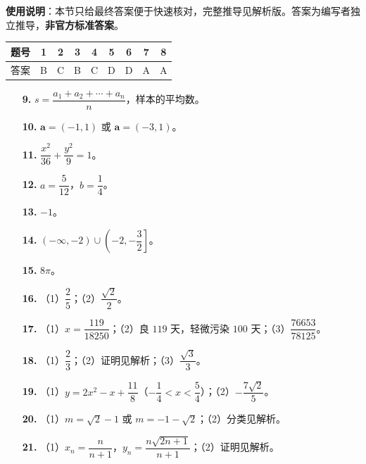 
\begin{gknotice}
\textbf{使用说明}：本节只给最终答案便于快速核对，完整推导见解析版。答案为编写者独立推导，\textbf{非官方标准答案}。
\end{gknotice}

\begin{center}\begin{tabular}{ccccccccc}
\toprule
题号 & 1 & 2 & 3 & 4 & 5 & 6 & 7 & 8 \\
\midrule
答案 & B & C & B & C & D & D & A & A \\
\bottomrule
\end{tabular}\end{center}

\begin{itemize}[leftmargin=2.6em]
  \item[\textbf{9.}] $s=\dfrac{a_1+a_2+\cdots+a_n}{n}$，样本的平均数。
  \item[\textbf{10.}] $\boldsymbol a=(-1,1)$ 或 $\boldsymbol a=(-3,1)$。
  \item[\textbf{11.}] $\dfrac{x^2}{36}+\dfrac{y^2}{9}=1$。
  \item[\textbf{12.}] $a=\dfrac{5}{12}$，$b=\dfrac14$。
  \item[\textbf{13.}] $-1$。
  \item[\textbf{14.}] $(-\infty,-2)\cup\left(-2,-\dfrac32\right]$。
  \item[\textbf{15.}] $8\pi$。
\end{itemize}

\begin{itemize}[leftmargin=2.6em]
  \item[\textbf{16.}] （1）$\dfrac25$；（2）$\dfrac{\sqrt2}{2}$。
  \item[\textbf{17.}] （1）$x=\dfrac{119}{18250}$；（2）良 $119$ 天，轻微污染 $100$ 天；（3）$\dfrac{76653}{78125}$。
  \item[\textbf{18.}] （1）$\dfrac23$；（2）证明见解析；（3）$\dfrac{\sqrt3}{3}$。
  \item[\textbf{19.}] （1）$y=2x^2-x+\dfrac{11}{8}$（$-\dfrac14<x<\dfrac54$）；（2）$-\dfrac{7\sqrt2}{5}$。
  \item[\textbf{20.}] （1）$m=\sqrt2-1$ 或 $m=-1-\sqrt2$；（2）分类见解析。
  \item[\textbf{21.}] （1）$x_n=\dfrac{n}{n+1}$，$y_n=\dfrac{n\sqrt{2n+1}}{n+1}$；（2）证明见解析。
\end{itemize}
